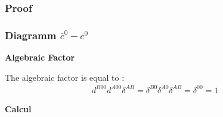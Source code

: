 \documentclass[a4paper,11pt]{article} %
\theoremstyle{plain}
\theoremstyle{definition}
\theoremstyle{remark}
\numberwithin{equation}{section}
\numberwithin{equation}{subsection}
\numberwithin{figure}{section}
\begin{document}
    \subsubsection{Proof}

    \subsubsection{Diagramm $\overline{c}^{0} - c^{0}$}

\textbf{Algebraic Factor}

The algebraic factor is equal to :
\begin{eqnarray*}
 d^{B00} d^{A00} \delta^{AB} = \delta^{B0}  \delta^{A0}  \delta^{AB} =  \delta^{00}  =  1
\end{eqnarray*}

\textbf{Calcul}
\end{document}
